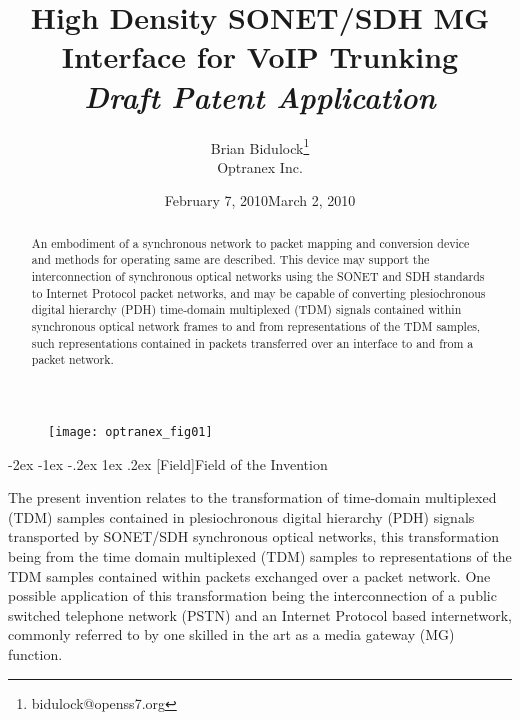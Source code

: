 \documentclass[letterpaper,final,notitlepage,twocolumn,10pt,twoside]{article}
\makeatletter
\let\large = \normalsize
\let\normalsize = \small
\let\small = \footnotesize
\let\footnotesize = \scriptsize
\let\scriptsize = \tiny
\renewcommand\section{\@startsection {section}{1}{\z@}%
                                   {-2ex \@plus -1ex \@minus -.2ex}%
                                   {1ex \@plus .2ex}%
                                   {\normalfont\large\bfseries}}
\makeatother
\begin{document}

\title{High Density SONET/SDH MG Interface for VoIP Trunking\\[0.5ex]
	{\large \textsl{Draft Patent Application}}}
\author{Brian Bidulock\thanks{bidulock@openss7.org}\\
	Optranex Inc.}
\date{February 7, 2010}
\date{March 2, 2010}
\maketitle

\begin{abstract}
An embodiment of a synchronous network to packet mapping and conversion device
and methods for operating same are described.  This device may support the
interconnection of synchronous optical networks using the SONET and SDH
standards to Internet Protocol packet networks, and may be capable of
converting plesiochronous digital hierarchy (PDH) time-domain multiplexed
(TDM) signals contained within synchronous optical network frames to and from
representations of the TDM samples, such representations contained in packets
transferred over an interface to and from a packet network.
\end{abstract}


\FloatBarrier
{}


\begin{figure}[htp]
\center\texttt{[image: optranex\_fig01]}
\label{figure:optranex_fig01}
\end{figure}

\section[Field]{Field of the Invention}

The present invention relates to the transformation of time-domain multiplexed
(TDM) samples contained in plesiochronous digital hierarchy (PDH) signals
transported by SONET/SDH synchronous optical networks, this transformation
being from the time domain multiplexed (TDM) samples to representations of the
TDM samples contained within packets exchanged over a packet network.  One
possible application of this transformation being the interconnection of a
public switched telephone network (PSTN) and an Internet Protocol based
internetwork, commonly referred to by one skilled in the art as a media
gateway (MG) function.
\end{document}
